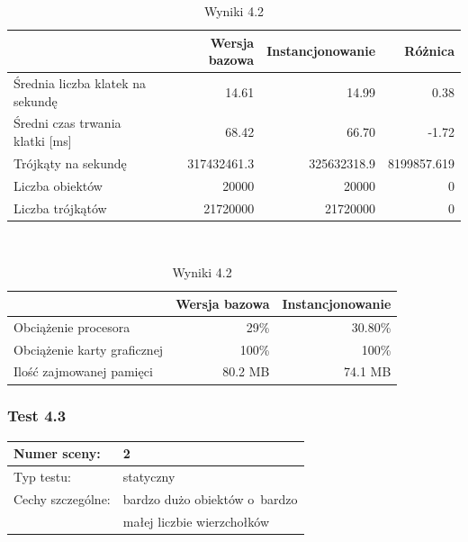 \documentclass[a4paper,twoside,12pt]{book}
\begin{document}
\begin{table}[H]
    \centering
    \caption{Wyniki 4.2}
    \label{tab:instancing_test2}
    \begin{tabular}{|l||r|r|r|}
        \hline
        & Wersja bazowa & Instancjonowanie & Różnica \\
        \hline
        Średnia liczba klatek na sekundę & 14.61 & 14.99 & 0.38 \\
        \hline
        Średni czas trwania klatki [ms] & 68.42 & 66.70 & -1.72 \\
        \hline
        Trójkąty na sekundę & 317432461.3 & 325632318.9 & 8199857.619 \\
        \hline
        Liczba obiektów & 20000 & 20000 & 0 \\
        \hline
        Liczba trójkątów & 21720000 & 21720000 & 0 \\
        \hline
    \end{tabular} \\
    
    \vspace*{0.5 cm}
    
    \begin{tabular}{|l||r|r|}
         \hline
        & Wersja bazowa & Instancjonowanie \\
         \hline
        Obciążenie procesora & 29\% & 30.80\% \\
        \hline
        Obciążenie karty graficznej & 100\% & 100\% \\
        \hline
        Ilość zajmowanej pamięci & 80.2 MB & 74.1 MB \\
        \hline
    \end{tabular}
\end{table}

\vbox{}

\subsubsection{Test 4.3}
\begin{tabular}{|l||l|}
\hline
Numer sceny: & 2 \\
\hline
Typ testu: & statyczny \\
\hline
Cechy szczególne: & bardzo dużo obiektów o~bardzo \\
& małej liczbie wierzchołków \\
\hline
\end{tabular}\\

\vbox{}
\end{document}
